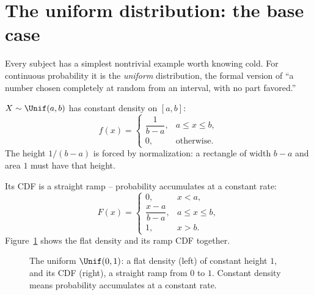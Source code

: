 \section{The uniform distribution: the base case}
\label{ch10:uniform}

Every subject has a simplest nontrivial example worth knowing cold. For continuous
probability it is the \emph{uniform} distribution, the formal version of ``a number
chosen completely at random from an interval, with no part favored.''

\begin{definition}
\label{ch10:def-unif}
$X \sim \Unif(a,b)$ has constant density on $[a,b]$:
\[
  f(x) = \begin{cases} \dfrac{1}{b-a}, & a \le x \le b,\\[6pt] 0, & \text{otherwise.}\end{cases}
\]
The height $1/(b-a)$ is forced by normalization: a rectangle of width $b-a$ and area
$1$ must have that height.
\end{definition}

Its CDF is a straight ramp -- probability accumulates at a constant rate:
\[
  F(x) = \begin{cases} 0, & x < a, \\[2pt] \dfrac{x-a}{b-a}, & a \le x \le b, \\[6pt] 1, & x > b. \end{cases}
\]
Figure~\ref{ch10:fig-unif} shows the flat density and its ramp CDF together.

\begin{figure}[H]
\centering
{}
\caption{The uniform $\Unif(0,1)$: a flat density (left) of constant height $1$, and
its CDF (right), a straight ramp from $0$ to $1$. Constant density means probability
accumulates at a constant rate.}
\label{ch10:fig-unif}
\end{figure}


